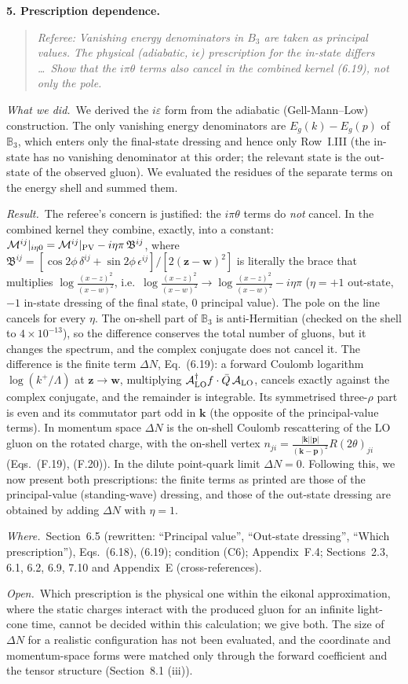 \documentclass[a4paper,11pt]{article}
\def\v#1{\mathbf{#1}}
\def\mf#1{\mathbb{#1}}
\newcommand{\point}[1]{\par\medskip\noindent\textbf{#1}\par}
\newcommand{\referee}[1]{\begin{quote}\small\emph{Referee:} \emph{#1}\end{quote}}
\newcommand{\done}{\par\noindent\emph{What we did.}\ }
\newcommand{\result}{\par\noindent\emph{Result.}\ }
\newcommand{\where}{\par\noindent\emph{Where.}\ }
\newcommand{\open}{\par\noindent\emph{Open.}\ }
\begin{document}
\point{5. Prescription dependence.}
\referee{Vanishing energy denominators in $B_3$ are taken as principal values. The physical (adiabatic, $i\epsilon$) prescription for the in-state differs \dots\ Show that the $i\pi\theta$ terms also cancel in the combined kernel (6.19), not only the pole.}
\done We derived the $i\varepsilon$ form from the adiabatic (Gell-Mann--Low) construction. The only vanishing energy denominators are $E_g(k)-E_g(p)$ of $\mf B_3$, which enters only the final-state dressing and hence only Row~I.III (the in-state has no vanishing denominator at this order; the relevant state is the out-state of the observed gluon). We evaluated the residues of the separate terms on the energy shell and summed them.
\result The referee's concern is justified: the $i\pi\theta$ terms do \emph{not} cancel. In the combined kernel they combine, exactly, into a constant: $\mathcal M^{ij}|_{i\eta0}=\mathcal M^{ij}|_{\rm PV}-i\eta\pi\,\mathfrak B^{ij}$, where $\mathfrak B^{ij}=[\cos2\phi\,\delta^{ij}+\sin2\phi\,\epsilon^{ij}]/[2(\v z-\v w)^2]$ is literally the brace that multiplies $\log\frac{(x-z)^2}{(x-w)^2}$, i.e.\ $\log\frac{(x-z)^2}{(x-w)^2}\to\log\frac{(x-z)^2}{(x-w)^2}-i\eta\pi$ ($\eta=+1$ out-state, $-1$ in-state dressing of the final state, $0$ principal value). The pole on the line cancels for every $\eta$. The on-shell part of $\mf B_3$ is anti-Hermitian (checked on the shell to $4\times10^{-13}$), so the difference conserves the total number of gluons, but it changes the spectrum, and the complex conjugate does not cancel it. The difference is the finite term $\Delta N$, Eq.~(6.19): a forward Coulomb logarithm $\log(k^+/\Lambda)$ at $\v z\to\v w$, multiplying $\mathcal A^\dagger_{\rm LO}f\cdot\bar Q\,\mathcal A_{\rm LO}$, cancels exactly against the complex conjugate, and the remainder is integrable. Its symmetrised three-$\rho$ part is even and its commutator part odd in $\v k$ (the opposite of the principal-value terms). In momentum space $\Delta N$ is the on-shell Coulomb rescattering of the LO gluon on the rotated charge, with the on-shell vertex $n_{ji}=\frac{|\v k||\v p|}{(\v k-\v p)^2}R(2\theta)_{ji}$ (Eqs.~(F.19), (F.20)). In the dilute point-quark limit $\Delta N=0$. Following this, we now present both prescriptions: the finite terms as printed are those of the principal-value (standing-wave) dressing, and those of the out-state dressing are obtained by adding $\Delta N$ with $\eta=1$.
\where Section~6.5 (rewritten: ``Principal value'', ``Out-state dressing'', ``Which prescription''), Eqs.~(6.18), (6.19); condition (C6); Appendix~F.4; Sections~2.3, 6.1, 6.2, 6.9, 7.10 and Appendix~E (cross-references).
\open Which prescription is the physical one within the eikonal approximation, where the static charges interact with the produced gluon for an infinite light-cone time, cannot be decided within this calculation; we give both. The size of $\Delta N$ for a realistic configuration has not been evaluated, and the coordinate and momentum-space forms were matched only through the forward coefficient and the tensor structure (Section~8.1 (iii)).
\end{document}
